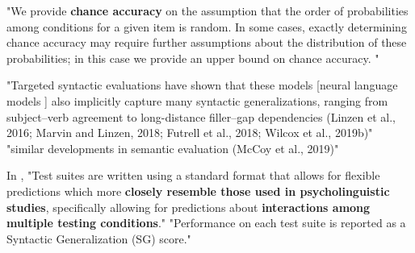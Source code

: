 "We provide \textbf{chance accuracy} on the assumption that the order of probabilities among conditions for a given item is random. In some cases, exactly determining chance accuracy may require further assumptions about the distribution of these probabilities; in this case we provide an upper bound on
chance accuracy. "  \citep{hu2020systematic} 



"Targeted syntactic evaluations have shown that these models [neural language models ] also implicitly capture many syntactic generalizations, ranging from subject–verb agreement to long-distance filler–gap dependencies (Linzen et al., 2016; Marvin and Linzen, 2018; Futrell et al., 2018; Wilcox et al., 2019b)" \citep{hu2020systematic}
"similar developments in semantic evaluation (McCoy et al., 2019)" \citep{hu2020systematic}

In \citet{hu2020systematic}, "Test suites are written using a standard format that allows for flexible predictions which more \textbf{closely resemble those used in psycholinguistic studies}, specifically allowing for predictions about \textbf{interactions among multiple testing conditions}."
"Performance on each test suite is reported as a Syntactic Generalization (SG) score." \citep{hu2020systematic}

